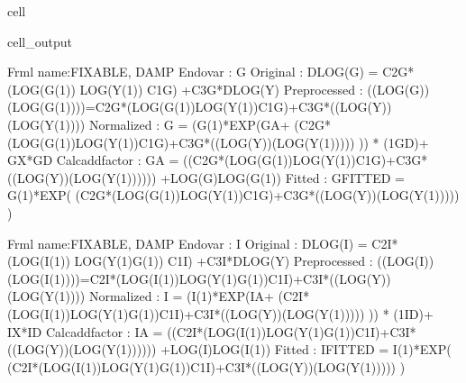 \documentclass[letterpaper,10pt,english]{jupyterBook}
\begin{document}
\begin{sphinxuseclass}{cell}
\begin{sphinxVerbatimOutput}
\begin{sphinxuseclass}{cell_output}
\begin{sphinxVerbatim}[commandchars=\\\{\}]
Frml name:\PYGZlt{}FIXABLE, DAMP\PYGZgt{}
Endo\PYGZus{}var        : G
Original        :  DLOG(G)  = \PYGZhy{}C2\PYGZus{}G*  (LOG(G(\PYGZhy{}1))\PYGZhy{}  LOG(Y(\PYGZhy{}1)) \PYGZhy{}        C1\PYGZus{}G)  +C3\PYGZus{}G*DLOG(Y)
Preprocessed    : ((LOG(G))\PYGZhy{}(LOG(G(\PYGZhy{}1))))=\PYGZhy{}C2\PYGZus{}G*(LOG(G(\PYGZhy{}1))\PYGZhy{}LOG(Y(\PYGZhy{}1))\PYGZhy{}C1\PYGZus{}G)+C3\PYGZus{}G*((LOG(Y))\PYGZhy{}(LOG(Y(\PYGZhy{}1))))
Normalized      : G = (G(\PYGZhy{}1)*EXP(G\PYGZus{}A+ (\PYGZhy{}C2\PYGZus{}G*(LOG(G(\PYGZhy{}1))\PYGZhy{}LOG(Y(\PYGZhy{}1))\PYGZhy{}C1\PYGZus{}G)+C3\PYGZus{}G*((LOG(Y))\PYGZhy{}(LOG(Y(\PYGZhy{}1))))) )) * (1\PYGZhy{}G\PYGZus{}D)+ G\PYGZus{}X*G\PYGZus{}D 
Calc\PYGZus{}add\PYGZus{}factor : G\PYGZus{}A = \PYGZhy{} ((\PYGZhy{}C2\PYGZus{}G*(LOG(G(\PYGZhy{}1))\PYGZhy{}LOG(Y(\PYGZhy{}1))\PYGZhy{}C1\PYGZus{}G)+C3\PYGZus{}G*((LOG(Y))\PYGZhy{}(LOG(Y(\PYGZhy{}1)))))) +LOG(G)\PYGZhy{}LOG(G(\PYGZhy{}1))
Fitted          : G\PYGZus{}FITTED = G(\PYGZhy{}1)*EXP( (\PYGZhy{}C2\PYGZus{}G*(LOG(G(\PYGZhy{}1))\PYGZhy{}LOG(Y(\PYGZhy{}1))\PYGZhy{}C1\PYGZus{}G)+C3\PYGZus{}G*((LOG(Y))\PYGZhy{}(LOG(Y(\PYGZhy{}1))))) )

Frml name:\PYGZlt{}FIXABLE, DAMP\PYGZgt{}
Endo\PYGZus{}var        : I
Original        :  DLOG(I)  =    \PYGZhy{}C2\PYGZus{}I*  (LOG(I(\PYGZhy{}1))\PYGZhy{}  LOG(Y(\PYGZhy{}1)\PYGZhy{}G(\PYGZhy{}1)) \PYGZhy{} C1\PYGZus{}I)   +C3\PYGZus{}I*DLOG(Y) 
Preprocessed    : ((LOG(I))\PYGZhy{}(LOG(I(\PYGZhy{}1))))=\PYGZhy{}C2\PYGZus{}I*(LOG(I(\PYGZhy{}1))\PYGZhy{}LOG(Y(\PYGZhy{}1)\PYGZhy{}G(\PYGZhy{}1))\PYGZhy{}C1\PYGZus{}I)+C3\PYGZus{}I*((LOG(Y))\PYGZhy{}(LOG(Y(\PYGZhy{}1))))
Normalized      : I = (I(\PYGZhy{}1)*EXP(I\PYGZus{}A+ (\PYGZhy{}C2\PYGZus{}I*(LOG(I(\PYGZhy{}1))\PYGZhy{}LOG(Y(\PYGZhy{}1)\PYGZhy{}G(\PYGZhy{}1))\PYGZhy{}C1\PYGZus{}I)+C3\PYGZus{}I*((LOG(Y))\PYGZhy{}(LOG(Y(\PYGZhy{}1))))) )) * (1\PYGZhy{}I\PYGZus{}D)+ I\PYGZus{}X*I\PYGZus{}D 
Calc\PYGZus{}add\PYGZus{}factor : I\PYGZus{}A = \PYGZhy{} ((\PYGZhy{}C2\PYGZus{}I*(LOG(I(\PYGZhy{}1))\PYGZhy{}LOG(Y(\PYGZhy{}1)\PYGZhy{}G(\PYGZhy{}1))\PYGZhy{}C1\PYGZus{}I)+C3\PYGZus{}I*((LOG(Y))\PYGZhy{}(LOG(Y(\PYGZhy{}1)))))) +LOG(I)\PYGZhy{}LOG(I(\PYGZhy{}1))
Fitted          : I\PYGZus{}FITTED = I(\PYGZhy{}1)*EXP( (\PYGZhy{}C2\PYGZus{}I*(LOG(I(\PYGZhy{}1))\PYGZhy{}LOG(Y(\PYGZhy{}1)\PYGZhy{}G(\PYGZhy{}1))\PYGZhy{}C1\PYGZus{}I)+C3\PYGZus{}I*((LOG(Y))\PYGZhy{}(LOG(Y(\PYGZhy{}1))))) )


\end{sphinxVerbatim}
\end{sphinxuseclass}
\end{sphinxVerbatimOutput}
\end{sphinxuseclass}
\end{document}
